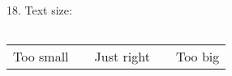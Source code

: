 18. Text size:
\begin{center}
 	\begin{tabular}{| p{1cm} | p{1cm} | p{1cm} | p{1cm} | p{1cm} |}
    	\hline
     	&  &  &  &  \\ \hline
  	\end{tabular}
\end{center}
\begin{center}
	\begin{tabular}{ >{\centering\arraybackslash}p{1cm}  >{\centering\arraybackslash}p{1cm}  >{\centering\arraybackslash}p{1cm}  >{\centering\arraybackslash}p{1cm}  >{\centering\arraybackslash}p{1cm} }
    Too small &  & Just right &  & Too big \\ 
 	\end{tabular}
\end{center}

